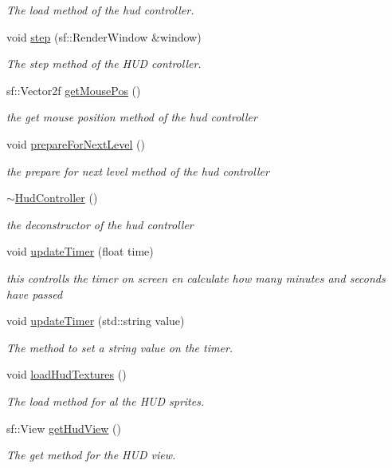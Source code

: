 \begin{DoxyCompactItemize}
\begin{DoxyCompactList}\small\item\em The load method of the hud controller. \end{DoxyCompactList}\item 
void \hyperlink{class_hud_controller_a6cd82988ca9221b6cb8d520a8e26b204}{step} (sf\+::\+Render\+Window \&window)
\begin{DoxyCompactList}\small\item\em The step method of the H\+U\+D controller. \end{DoxyCompactList}\item 
sf\+::\+Vector2f \hyperlink{class_hud_controller_a4c6c9c53841c41d156a2f715a43be703}{get\+Mouse\+Pos} ()
\begin{DoxyCompactList}\small\item\em the get mouse position method of the hud controller \end{DoxyCompactList}\item 
void \hyperlink{class_hud_controller_a9e9c4e19bdb0bc55247c96e79c5548c3}{prepare\+For\+Next\+Level} ()
\begin{DoxyCompactList}\small\item\em the prepare for next level method of the hud controller \end{DoxyCompactList}\item 
\hyperlink{class_hud_controller_a53264716b1a602a351a7bfcebb0d4dc1}{$\sim$\+Hud\+Controller} ()
\begin{DoxyCompactList}\small\item\em the deconstructor of the hud controller \end{DoxyCompactList}\item 
void \hyperlink{class_hud_controller_a55b2cf773dafe63e4ea80dee44520b46}{update\+Timer} (float time)
\begin{DoxyCompactList}\small\item\em this controlls the timer on screen en calculate how many minutes and seconds have passed \end{DoxyCompactList}\item 
void \hyperlink{class_hud_controller_a286572c787019d2ac71808619f51d09b}{update\+Timer} (std\+::string value)
\begin{DoxyCompactList}\small\item\em The method to set a string value on the timer. \end{DoxyCompactList}\item 
void \hyperlink{class_hud_controller_a42109bcccbd0e6c036d8fca3ad0c1354}{load\+Hud\+Textures} ()
\begin{DoxyCompactList}\small\item\em The load method for al the H\+U\+D sprites. \end{DoxyCompactList}\item 
sf\+::\+View \hyperlink{class_hud_controller_ace2b98787960f4278d783da1cf7b37dc}{get\+Hud\+View} ()
\begin{DoxyCompactList}\small\item\em The get method for the H\+U\+D view. \end{DoxyCompactList}\end{DoxyCompactItemize}
